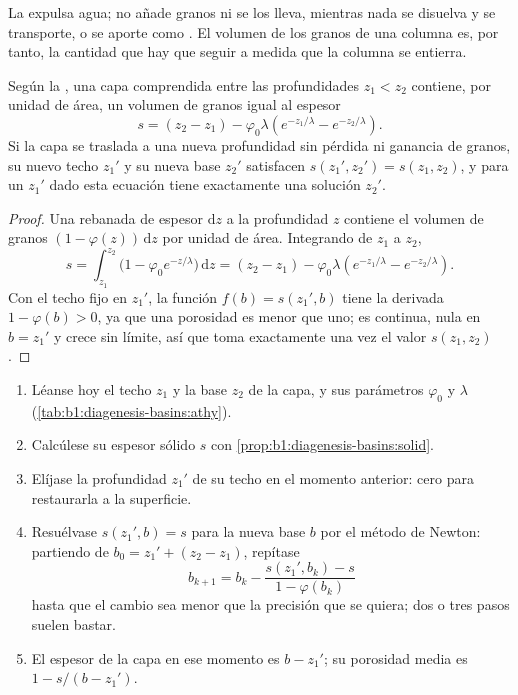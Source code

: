 La  expulsa agua; no añade granos ni se los lleva, mientras nada se disuelva y se transporte, o se aporte como . El volumen de los granos de una columna es, por tanto, la cantidad que hay que seguir a medida que la columna se entierra.

\begin{proposition}\label{prop:b1:diagenesis-basins:solid}
Según la , una capa comprendida entre las profundidades $z_1 < z_2$ contiene, por unidad de área, un volumen de granos igual al espesor
\[
  s = (z_2 - z_1) - \varphi_0 \lambda \left( e^{-z_1/\lambda} - e^{-z_2/\lambda} \right).
\]
Si la capa se traslada a una nueva profundidad sin pérdida ni ganancia de granos, su nuevo techo $z_1'$ y su nueva base $z_2'$ satisfacen $s(z_1', z_2') = s(z_1, z_2)$, y para un $z_1'$ dado esta ecuación tiene exactamente una solución $z_2'$.
\end{proposition}

\begin{proof}
Una rebanada de espesor $\mathrm dz$ a la profundidad $z$ contiene el volumen de granos $(1 - \varphi(z))\,\mathrm dz$ por unidad de área. Integrando de $z_1$ a $z_2$,
\[
  s = \int_{z_1}^{z_2} \bigl(1 - \varphi_0 e^{-z/\lambda}\bigr)\,\mathrm dz
    = (z_2 - z_1) - \varphi_0\lambda\left(e^{-z_1/\lambda} - e^{-z_2/\lambda}\right).
\]
Con el techo fijo en $z_1'$, la función $f(b) = s(z_1', b)$ tiene la derivada $1 - \varphi(b) > 0$, ya que una porosidad es menor que uno; es continua, nula en $b = z_1'$ y crece sin límite,
así que toma exactamente una vez el valor $s(z_1, z_2)$.
\end{proof}

\begin{method}\label{met:b1:diagenesis-basins:decompaction}
\begin{enumerate}
  \item Léanse hoy el techo $z_1$ y la base $z_2$ de la capa, y sus parámetros $\varphi_0$ y $\lambda$
        (\cref{tab:b1:diagenesis-basins:athy}).
  \item Calcúlese su espesor sólido $s$ con \cref{prop:b1:diagenesis-basins:solid}.
  \item Elíjase la profundidad $z_1'$ de su techo en el momento anterior: cero para restaurarla a la superficie.
  \item Resuélvase $s(z_1', b) = s$ para la nueva base $b$ por el método de Newton: partiendo de $b_0 = z_1' + (z_2 - z_1)$, repítase
        \[
          b_{k+1} = b_k - \frac{s(z_1', b_k) - s}{1 - \varphi(b_k)}
        \]
        hasta que el cambio sea menor que la precisión que se quiera; dos o tres pasos suelen bastar.
  \item El espesor de la capa en ese momento es $b - z_1'$; su porosidad media es $1 - s/(b - z_1')$.
\end{enumerate}
\end{method}

